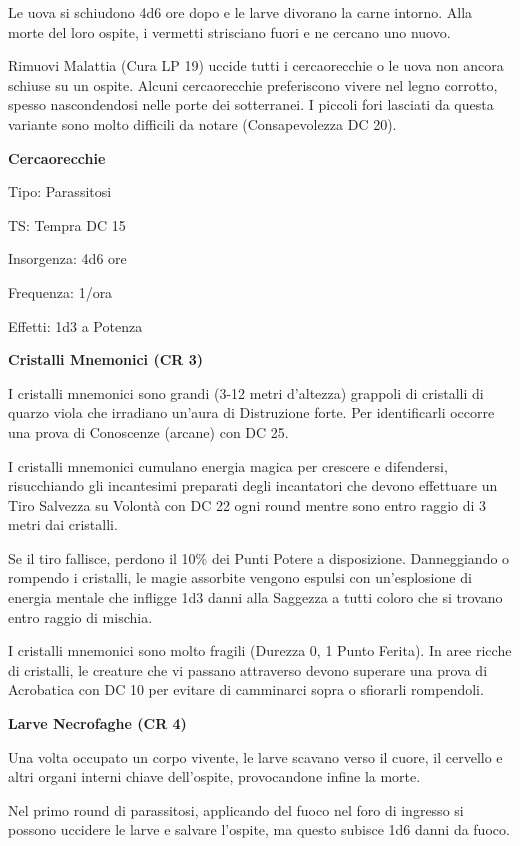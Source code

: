 \documentclass[a4paper,11pt,twoside,openany]{book}
\begin{document}
{Le uova si schiudono 4d6 ore dopo e le larve divorano la carne intorno. Alla morte del loro ospite, i vermetti strisciano fuori e ne cercano uno nuovo.

Rimuovi Malattia (Cura LP 19) uccide tutti i cercaorecchie o le uova non ancora schiuse su un ospite. Alcuni cercaorecchie preferiscono vivere nel legno corrotto, spesso nascondendosi nelle porte dei sotterranei. I piccoli fori lasciati da questa variante sono molto difficili da notare (Consapevolezza DC 20).

\textbf{Cercaorecchie}

Tipo: Parassitosi

TS: Tempra DC 15

Insorgenza: 4d6 ore

Frequenza: 1/ora

Effetti: 1d3 a Potenza

\textbf{Cristalli Mnemonici (CR 3)}

I cristalli mnemonici sono grandi (3-12 metri d'altezza) grappoli di cristalli di quarzo viola che irradiano un'aura di Distruzione forte. Per identificarli occorre una prova di Conoscenze (arcane) con DC 25.

I cristalli mnemonici cumulano energia magica per crescere e difendersi, risucchiando gli incantesimi preparati degli incantatori che devono effettuare un Tiro Salvezza su Volontà con DC 22 ogni round mentre sono entro raggio di 3 metri dai cristalli.

Se il tiro fallisce, perdono il 10\% dei Punti Potere a disposizione. Danneggiando o rompendo i cristalli, le magie assorbite vengono espulsi con un'esplosione di energia mentale che infligge 1d3 danni alla Saggezza a tutti coloro che si trovano entro raggio di mischia.

I cristalli mnemonici sono molto fragili (Durezza 0, 1 Punto Ferita).
In aree ricche di cristalli, le creature che vi passano attraverso devono superare una prova di Acrobatica con DC 10 per evitare di camminarci sopra o sfiorarli rompendoli.

\textbf{Larve Necrofaghe (CR 4)}

Una volta occupato un corpo vivente, le larve scavano verso il cuore, il cervello e altri organi interni chiave dell'ospite, provocandone infine la morte.

Nel primo round di parassitosi, applicando del fuoco nel foro di ingresso si possono uccidere le larve e salvare l'ospite, ma questo subisce 1d6 danni da fuoco. 

}
\end{document}

